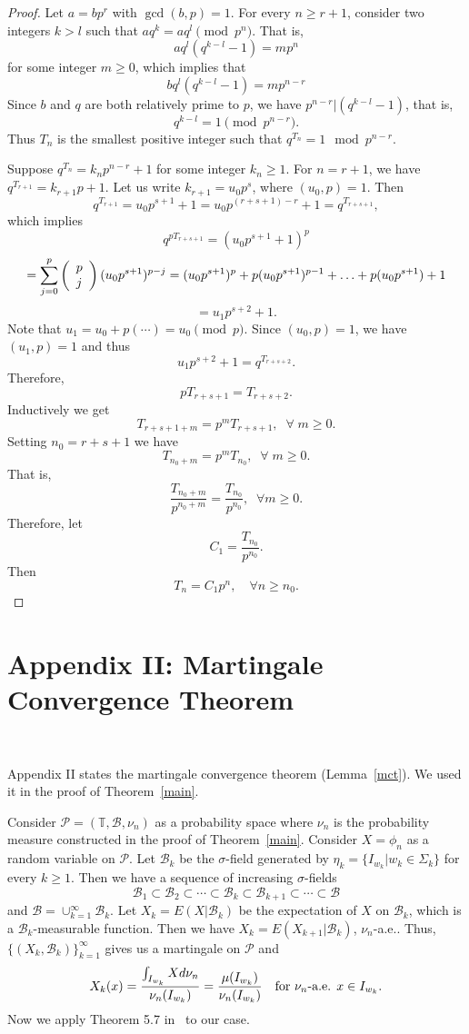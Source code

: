 \documentclass[11pt]{amsart}
\theoremstyle{definition}
\def\m{\mu}
\def\T{\mathbb{T}}
\def\S{\Sigma}
\def\s{\sigma}
\def\B{\mathcal{B}}
\def\P{\mathcal{P}}
\def\s{\sigma}
\def\P{\mathcal{P}}
\begin{document}
\begin{proof}
Let $a=bp^r$ with $\gcd(b,p)=1$. For every $n\geq r+1$, consider two integers $k>l$ 
such that $aq^k=aq^l \pmod{p^n}$. That is, 
$$
aq^l(q^{k-l}-1)= m p^n
$$
for some integer $m\geq 0$, 
which implies that 
$$
b q^l(q^{k-l}-1)=mp^{n-r}
$$
Since $b$ and $q$ are both relatively prime to $p$, we have $p^{n-r}|(q^{k-l}-1)$, that is,
$$
q^{k-l}=1\pmod{p^{n-r}}.
$$
Thus $T_{n}$ is the smallest positive integer such that $q^{T_{n}}=1\mod p^{n-r}$. 

Suppose $q^{T_n}=k_{n} p^{n-r}+1$ for some integer $k_{n}\geq 1$. 
For $n=r+1$, we have
$q^{T_{r+1}}=k_{r+1}p+1$.
Let us write $k_{r+1}=u_0p^s$, where $(u_0,p)=1$. Then
$$
q^{T_{r+1}}=u_0p^{s+1}+1=u_0p^{(r+s+1)-r}+1=q^{T_{r+s+1}},
$$
which implies
$$
q^{pT_{r+s+1}}=(u_0p^{s+1}+1)^p
$$
$$
=\sum_{j=0}^p\left(\begin{array}{l}p\cr                           j
\end{array}\right)(u_0p^{s+1})^{p-j} =(u_0p^{s+1})^p+p(u_0p^{s+1})^{p-1}+\ldots+p(u_0p^{s+1})+1
$$
$$
=u_1p^{s+2}+1.
$$
Note that
$u_1=u_0+p(\cdots)=u_0\pmod{p}$.
Since $(u_0,p)=1$, we have $(u_1,p)=1$ and thus
$$
u_1p^{s+2}+1=q^{T_{r+s+2}}.
$$
Therefore,
$$
pT_{r+s+1}=T_{r+s+2}.
$$
Inductively we get
$$
T_{r+s+1+m}=p^mT_{r+s+1}, \;\;\forall \; m\geq 0.
$$
Setting $n_0=r+s+1$ we have
$$
T_{n_0+m}=p^mT_{n_0}, \;\;\forall \; m\geq 0.
$$
That is,
$$
\frac{T_{n_0+m}}{p^{n_0+m}}=\frac{T_{n_0}}{p^{n_0}},\;\;\forall m\geq 0.
$$
Therefore, let
$$
C_{1}=\frac{T_{n_0}}{p^{n_0}}.
$$
Then
\[T_n=C_{1}p^n, \quad\forall n\geq n_0.\]
\end{proof}
 
 \section{\bf Appendix II: Martingale Convergence Theorem}~\label{mctsect} 
 
Appendix II states the martingale convergence theorem (Lemma~\ref{mct}). We used it in the proof of Theorem~\ref{main}.

Consider $\P=(\T, \B, \nu_{n})$ as a probability space where $\nu_{n}$ is the probability measure constructed in the proof of Theorem~\ref{main}. Consider $X=\phi_{n}$ as a random variable on $\P$. Let $\B_{k}$ be the $\s$-field generated 
by $\eta_{k} =\{ I_{w_{k}} | w_{k}\in \S_{k}\}$ for every $k\geq 1$. Then we have a sequence of increasing $\s$-fields 
$$
\B_{1} \subset \B_{2}\subset \cdots \subset \B_{k}\subset \B_{k+1}\subset \cdots\subset \B
$$
and $\B=\cup_{k=1}^{\infty} \B_{k}$. Let $X_{k} =E(X|\B_{k})$ be the expectation of $X$ on $\B_{k}$, which is a $\B_{k}$-measurable function. Then we have $X_{k} = E(X_{k+1}| \B_{k})$, $\nu_{n}$-a.e.. Thus, 
$
\{ (X_{k}, \B_{k})\}_{k=1}^{\infty}
$
gives us a martingale on $\P$ and 
$$
X_{k} (x) =\frac{ \int_{I_{w_{k}}} Xd\nu_{n}} { \nu_{n} (I_{w_{k}})} = \frac{\m (I_{w_{k}})} {\nu_{n} (I_{w_{k}})}\quad \hbox{for $\nu_{n}$-a.e. $x\in I_{w_{k}}$}.
$$
Now we apply Theorem 5.7 in~\cite{V} to our case.
\end{document}
